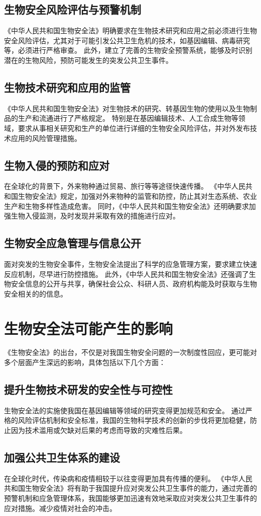 \documentclass{article}
\begin{document}
\subsection{生物安全风险评估与预警机制}
《中华人民共和国生物安全法》明确要求在生物技术研究和应用之前必须进行生物安全风险评估，尤其对于可能引发公共卫生危机的技术，如基因编辑、病毒研究等，必须进行严格审查。
此外，建立了完善的生物安全预警系统，能够及时识别潜在的生物风险，预防可能发生的突发公共卫生事件。
\subsection{生物技术研究和应用的监管}
《中华人民共和国生物安全法》对生物技术的研究、转基因生物的使用以及生物制品的生产和流通进行了严格规定。
特别是在基因编辑技术、人工合成生物等领域，要求从事相关研究和生产的单位进行详细的生物安全风险评估，并对外发布技术应用的风险管理措施。
\subsection{生物入侵的预防和应对}
在全球化的背景下，外来物种通过贸易、旅行等等途径快速传播。
《中华人民共和国生物安全法》规定，加强对外来物种的监管和防控，防止其对生态系统、农业生产和生物多样性造成危害。
同时，《中华人民共和国生物安全法》还明确要求加强生物入侵监测，及时发现并采取有效的措施进行应对。
\subsection{生物安全应急管理与信息公开}
面对突发的生物安全事件，生物安全法提出了科学的应急管理方案，要求建立快速反应机制，尽早进行防控措施。
此外，《中华人民共和国生物安全法》还强调了生物安全信息的公开与共享，确保社会公众、科研人员、政府机构能及时获取与生物安全相关的的信息。

\section{生物安全法可能产生的影响}
《生物安全法》的出台，不仅是对我国生物安全问题的一次制度性回应，更可能对多个层面产生深远的影响，具体包括以下几个方面：
\subsection{提升生物技术研发的安全性与可控性}
生物安全法的实施使我国在基因编辑等领域的研究变得更加规范和安全。
通过严格的风险评估机制和安全标准，我国的生物科学技术的创新的步伐将更加稳健，防止因为技术滥用或欠缺对后果的考虑而导致的灾难性后果。
\subsection{加强公共卫生体系的建设}
在全球化时代，传染病和疫情相较于以往变得更加具有传播的便利。
《中华人民共和国生物安全法》将有助于我国提升应对突发公共卫生事件的能力，通过完善的预警机制和应急管理体系，我国能够更加迅速有效地采取应对突发公共卫生事件的应对措施。减少疫情对社会的冲击。
\end{document}
